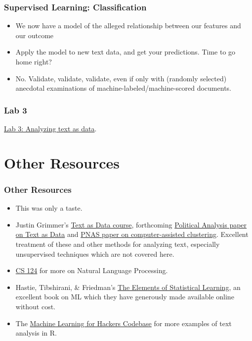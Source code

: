 \documentclass[]{beamer}
\begin{document}
\begin{frame}
  \frametitle{Supervised Learning: Classification}   %
  \begin{itemize}
  \item We now have a model of the alleged relationship between our features and our outcome
  \item Apply the model to new text data, and get your predictions.  Time to go home right?
  \item No. Validate, validate, validate, even if only with (randomly selected) anecdotal examinations of machine-labeled/machine-scored documents.
  \end{itemize}
\end{frame}

\begin{frame}
  \frametitle{Lab 3}   %
	\href{https://dl.dropbox.com/u/25710348/CSSscraping/scripts/Text2Data.R}{\color{blue} Lab 3: Analyzing text as data}.
\end{frame}

\section{Other Resources}
\setcounter{subsection}{1}
\begin{frame}
  \frametitle{Other Resources}   %
  \begin{itemize}
  \item This was only a taste. 
  \item Justin Grimmer's \href{http://www.justingrimmer.org/teaching.html}{\color{blue} Text as Data course}, forthcoming \href{http://stanford.edu/~jgrimmer/tad2.pdf}{\color{blue} Political Analysis paper on Text as Data} and \href{http://gking.harvard.edu/gking/files/201018067_online_1.pdf}{\color{blue} PNAS paper on computer-assisted clustering}.  Excellent treatment of these and other methods for analyzing text, especially unsupervised techniques which are not covered here.  
  \item \href{http://www.stanford.edu/class/cs124/}{\color{blue} CS 124} for more on Natural Language Processing.
  \item Hastie, Tibshirani, \& Friedman's \href{http://www-stat.stanford.edu/~tibs/ElemStatLearn/}{\color{blue} The Elements of Statistical Learning}, an excellent book on ML which they have generously made available online without cost.
  \item The \href{https://github.com/johnmyleswhite/ML_for_Hackers}{\color{blue} Machine Learning for Hackers Codebase} for more examples of text analysis in R.
  \end{itemize}
\end{frame}
\end{document}
